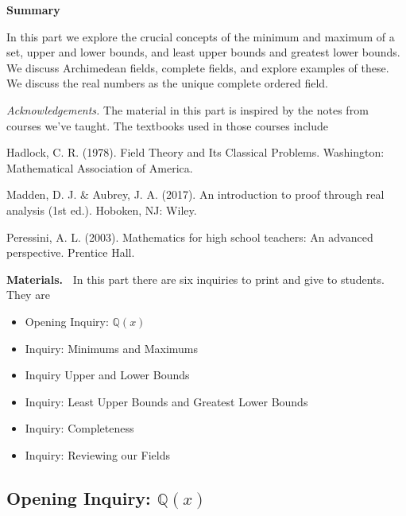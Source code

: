 \documentclass[11pt]{article}
\newcommand\header[1]{\vspace*{4pt}\par {\large {\bf #1}}\par}
\newenvironment{bignote}[1][Instructor note]%
	{\begin{mdframed}\raggedright{\bf #1.~}}
	{\end{mdframed}}
\theoremstyle{definition}
\begin{document}
\header{Summary}

In this part we explore the crucial concepts of the minimum and maximum of a set,
upper and lower bounds, and least upper bounds and greatest lower bounds. We discuss
Archimedean fields, complete fields, and explore examples of these. We discuss the real
numbers as the unique complete ordered field.

{\it Acknowledgements.}  The material in this part is inspired by the notes from courses we've taught. The textbooks used in those courses include

Hadlock, C. R. (1978). Field Theory and Its Classical Problems. Washington: Mathematical Association of America.

Madden, D. J. \& Aubrey, J. A. (2017). An introduction to proof through real analysis (1st ed.). Hoboken, NJ: Wiley.

Peressini, A. L. (2003). Mathematics for high school teachers: An advanced perspective. Prentice Hall.

\newpage
\begin{bignote}[Materials]
  In this part there are six inquiries to print and give to students. They are
\begin{itemize}
  \item Opening Inquiry: $\mathbb{Q}(x)$
  \item Inquiry: Minimums and Maximums
  \item Inquiry Upper and Lower Bounds
  \item Inquiry: Least Upper Bounds and Greatest Lower Bounds
  \item Inquiry: Completeness
  \item Inquiry: Reviewing our Fields
\end{itemize}
\end{bignote}


\subsection{Opening Inquiry: $\mathbb{Q}(x)$}
\end{document}
